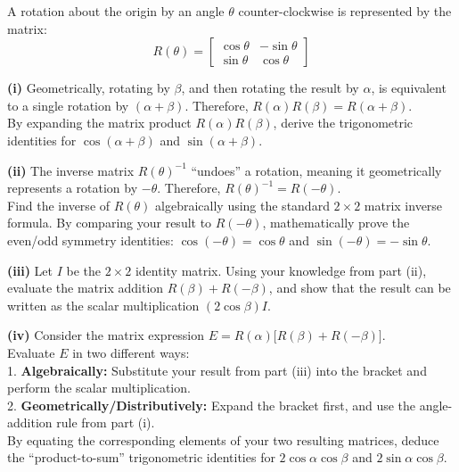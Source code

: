 \begin{problem}
A rotation about the origin by an angle $\theta$ counter-clockwise is represented by the matrix:
\[R(\theta) = \begin{bmatrix} \cos\theta & -\sin\theta \\ \sin\theta & \cos\theta \end{bmatrix}\]

\textbf{(i)} Geometrically, rotating by $\beta$, and then rotating the result by $\alpha$, is equivalent to a single rotation by $(\alpha + \beta)$. Therefore, $R(\alpha)R(\beta) = R(\alpha + \beta)$. \\
By expanding the matrix product $R(\alpha)R(\beta)$, derive the trigonometric identities for $\cos(\alpha + \beta)$ and $\sin(\alpha + \beta)$.

\textbf{(ii)} The inverse matrix $R(\theta)^{-1}$ ``undoes'' a rotation, meaning it geometrically represents a rotation by $-\theta$. Therefore, $R(\theta)^{-1} = R(-\theta)$. \\
Find the inverse of $R(\theta)$ algebraically using the standard $2 \times 2$ matrix inverse formula. By comparing your result to $R(-\theta)$, mathematically prove the even/odd symmetry identities: $\cos(-\theta) = \cos\theta$ and $\sin(-\theta) = -\sin\theta$.

\textbf{(iii)} Let $I$ be the $2 \times 2$ identity matrix. Using your knowledge from part (ii), evaluate the matrix addition $R(\beta) + R(-\beta)$, and show that the result can be written as the scalar multiplication $(2\cos\beta)I$.

\textbf{(iv)} Consider the matrix expression $E = R(\alpha) \big[ R(\beta) + R(-\beta) \big]$. \\
Evaluate $E$ in two different ways: \\
1. \textbf{Algebraically:} Substitute your result from part (iii) into the bracket and perform the scalar multiplication. \\
2. \textbf{Geometrically/Distributively:} Expand the bracket first, and use the angle-addition rule from part (i). \\
By equating the corresponding elements of your two resulting matrices, deduce the ``product-to-sum'' trigonometric identities for $2\cos\alpha\cos\beta$ and $2\sin\alpha\cos\beta$.
\end{problem}

